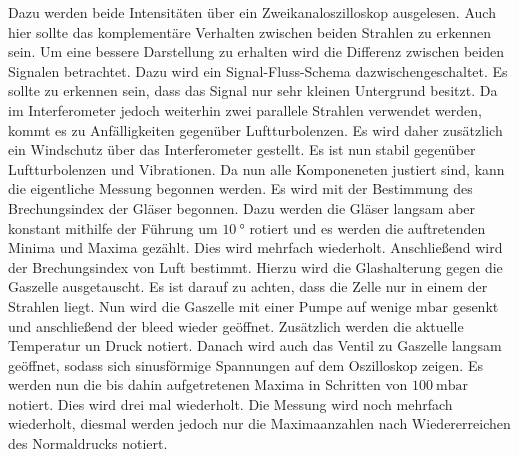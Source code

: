  Dazu werden beide Intensitäten über ein Zweikanaloszilloskop ausgelesen. Auch hier sollte das komplementäre Verhalten zwischen beiden Strahlen zu erkennen sein. Um eine bessere Darstellung zu erhalten wird die Differenz zwischen beiden Signalen betrachtet. Dazu wird ein Signal-Fluss-Schema dazwischengeschaltet. Es sollte zu erkennen sein, dass das Signal nur sehr kleinen Untergrund besitzt. Da im Interferometer jedoch weiterhin zwei parallele Strahlen verwendet werden, kommt es zu Anfälligkeiten gegenüber Luftturbolenzen. Es wird daher zusätzlich ein Windschutz über das Interferometer gestellt. Es ist nun stabil gegenüber Luftturbolenzen und Vibrationen. Da nun alle Komponeneten justiert sind, kann die eigentliche Messung begonnen werden. Es wird mit der Bestimmung des Brechungsindex der Gläser begonnen. Dazu werden die Gläser langsam aber konstant mithilfe der Führung um $\SI{10}{\degree}$ rotiert und es werden die auftretenden Minima und Maxima gezählt. Dies wird mehrfach wiederholt. Anschließend wird der Brechungsindex von Luft bestimmt. Hierzu wird die Glashalterung gegen die Gaszelle ausgetauscht. Es ist darauf zu achten, dass die Zelle nur in einem der Strahlen liegt. Nun wird die Gaszelle mit einer Pumpe auf wenige $\si{\milli\bar}$ gesenkt und anschließend der bleed wieder geöffnet. Zusätzlich werden die aktuelle Temperatur un Druck notiert. Danach wird auch das Ventil zu Gaszelle langsam geöffnet, sodass sich sinusförmige Spannungen auf dem Oszilloskop zeigen. Es werden nun die bis dahin aufgetretenen Maxima in Schritten von $\SI{100}{\milli\bar}$ notiert. Dies wird drei mal wiederholt. Die Messung wird noch mehrfach wiederholt, diesmal werden jedoch nur die Maximaanzahlen nach Wiedererreichen des Normaldrucks notiert. 